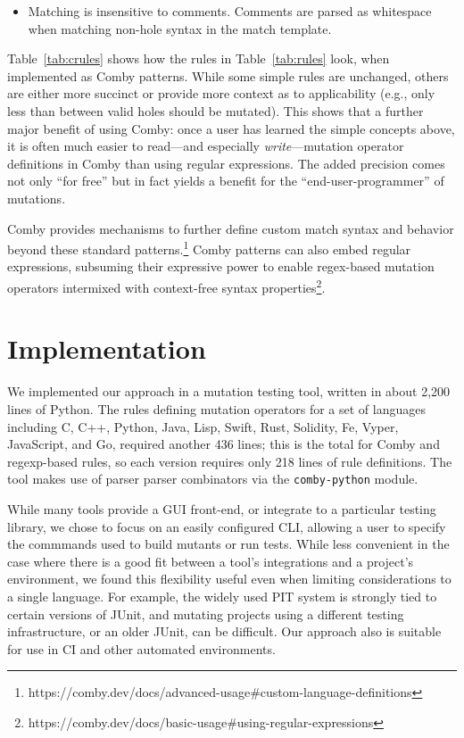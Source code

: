 \documentclass[sigconf,review, anonymous]{acmart}
\begin{document}
{\begin{itemize}
\item Matching is insensitive to comments. Comments are parsed as whitespace when matching non-hole syntax in the match template.

\end{itemize}

Table~\ref{tab:crules} shows how the rules in Table~\ref{tab:rules}
look, when implemented as Comby patterns.  While some simple rules are
unchanged, others are either more succinct or provide more context as
to applicability (e.g., only less than between valid holes should be
mutated).  This shows that a
further major benefit of using Comby: once a user has learned
the simple concepts above, it is often much easier to read---and
especially \emph{write}---mutation
operator definitions in Comby than using regular expressions.  The
added precision comes not only ``for free'' but in fact yields a
benefit for the ``end-user-programmer'' of mutations.

Comby provides mechanisms to further define custom match syntax and behavior
beyond these standard patterns.\footnote{https://comby.dev/docs/advanced-usage\#custom-language-definitions} Comby patterns can also embed regular expressions, subsuming their
expressive power to enable regex-based mutation operators intermixed with
context-free syntax
properties\footnote{https://comby.dev/docs/basic-usage\#using-regular-expressions}.

\section{Implementation}
\label{sec:imp}

We implemented our approach in a mutation testing tool, written in
about 2,200 lines of Python.  The rules defining mutation operators
for a set of languages including C, C++, Python, Java, Lisp, Swift,
Rust, Solidity, Fe, Vyper, JavaScript, and Go, required another 436
lines; this is the total for Comby and regexp-based rules, so each
version requires only 218 lines of rule definitions.  The tool makes
use of parser parser combinators via the {\tt comby-python} module.

While many tools provide a GUI front-end, or integrate to a particular
testing library, we chose to focus on an easily configured CLI,
allowing a user to specify the commmands used to build mutants or
run tests.  While less convenient in the case where there is a good
fit between a tool's integrations and a project's environment, we
found this flexibility useful even when limiting considerations to a
single language.  For example, the widely used PIT system is strongly tied to
certain versions of JUnit, and mutating projects using a different
testing infrastructure, or an older JUnit, can be difficult.  Our
approach also is suitable for use in CI and other automated
environments.

}
\end{document}
